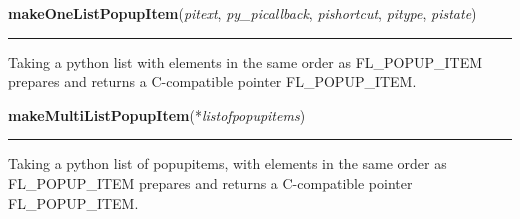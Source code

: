     \label{xformslib:library:makeOneListPopupItem}

    \vspace{0.5ex}

\hspace{.8\funcindent}\begin{boxedminipage}{\funcwidth}

    \raggedright \textbf{makeOneListPopupItem}(\textit{pitext}, \textit{py\_picallback}, \textit{pishortcut}, \textit{pitype}, \textit{pistate})

    \vspace{-1.5ex}

    \rule{\textwidth}{0.5\fboxrule}
\setlength{\parskip}{2ex}
    Taking a python list with elements in the same order as FL\_POPUP\_ITEM
    prepares and returns a C-compatible pointer FL\_POPUP\_ITEM.

\setlength{\parskip}{1ex}
    \end{boxedminipage}

    \label{xformslib:library:makeMultiListPopupItem}

    \vspace{0.5ex}

\hspace{.8\funcindent}\begin{boxedminipage}{\funcwidth}

    \raggedright \textbf{makeMultiListPopupItem}(*\textit{listofpopupitems})

    \vspace{-1.5ex}

    \rule{\textwidth}{0.5\fboxrule}
\setlength{\parskip}{2ex}
    Taking a python list of popupitems, with elements in the same order as 
    FL\_POPUP\_ITEM prepares and returns a C-compatible pointer 
    FL\_POPUP\_ITEM.

\setlength{\parskip}{1ex}
    \end{boxedminipage}

    \label{xformslib:library:FL_IS_UPBOX}

    \vspace{0.5ex}

